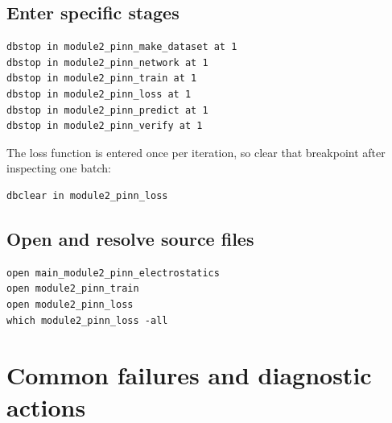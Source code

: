 \documentclass[11pt]{article}
\begin{document}
\subsection{Enter specific stages}

\begin{lstlisting}[style=projectmatlab]
dbstop in module2_pinn_make_dataset at 1
dbstop in module2_pinn_network at 1
dbstop in module2_pinn_train at 1
dbstop in module2_pinn_loss at 1
dbstop in module2_pinn_predict at 1
dbstop in module2_pinn_verify at 1
\end{lstlisting}
The loss function is entered once per iteration, so clear that breakpoint after inspecting one batch:
\begin{lstlisting}[style=projectmatlab]
dbclear in module2_pinn_loss
\end{lstlisting}

\subsection{Open and resolve source files}

\begin{lstlisting}[style=projectmatlab]
open main_module2_pinn_electrostatics
open module2_pinn_train
open module2_pinn_loss
which module2_pinn_loss -all
\end{lstlisting}

\section{Common failures and diagnostic actions}
\end{document}
